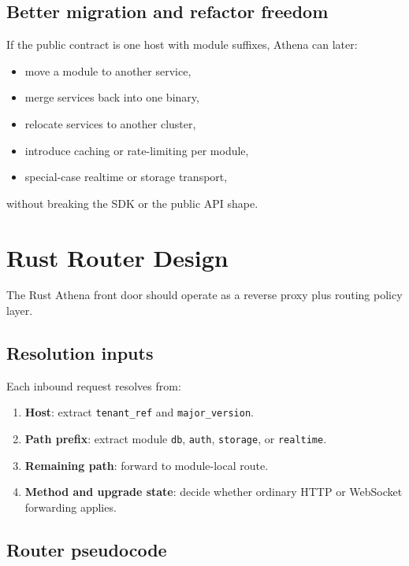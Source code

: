 \documentclass[11pt]{article}
\begin{document}
\subsection{Better migration and refactor freedom}

If the public contract is one host with module suffixes, Athena can later:

\begin{itemize}[leftmargin=1.5em]
  \item move a module to another service,
  \item merge services back into one binary,
  \item relocate services to another cluster,
  \item introduce caching or rate-limiting per module,
  \item special-case realtime or storage transport,
\end{itemize}

without breaking the SDK or the public API shape.

\section{Rust Router Design}

The Rust Athena front door should operate as a reverse proxy plus routing policy layer.

\subsection{Resolution inputs}

Each inbound request resolves from:

\begin{enumerate}[leftmargin=1.5em]
  \item \textbf{Host}: extract \texttt{tenant\_ref} and \texttt{major\_version}.
  \item \textbf{Path prefix}: extract module \texttt{db}, \texttt{auth}, \texttt{storage}, or \texttt{realtime}.
  \item \textbf{Remaining path}: forward to module-local route.
  \item \textbf{Method and upgrade state}: decide whether ordinary HTTP or WebSocket forwarding applies.
\end{enumerate}

\subsection{Router pseudocode}
\end{document}
